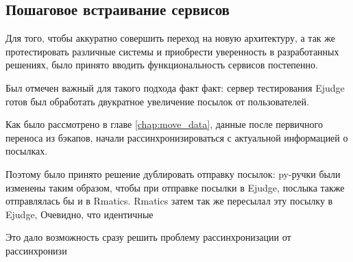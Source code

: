\subsection{Пошаговое встраивание сервисов}

Для того, чтобы аккуратно совершить переход на новую архитектуру, 
а так же протестировать различные системы и приобрести уверенность в разработанных решениях, было принято вводить функциональность сервисов постепенно.

Был отмечен важный для такого подхода факт факт: 
сервер тестирования Ejudge готов был обработать двукратное увеличение посылок от пользователей.

Как было рассмотрено в главе \ref{chap:move_data}, 
данные после первичного переноса из бэкапов, начали рассинхронизироваться с актуальной информацией о посылках.

Поэтому было принято решение дублировать отправку посылок: 
py-ручки были изменены таким образом, чтобы при отправке посылки в Ejudge,
послыка также отправлялась бы и в Rmatics.
Rmatics затем так же пересылал эту посылку в Ejudge, 
Очевидно, что идентичные 

Это дало возможность сразу решить проблему рассинхронизации от рассинхронизи